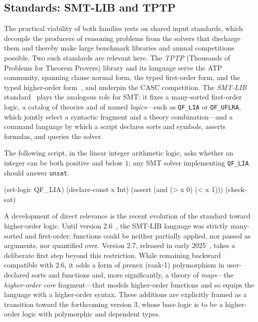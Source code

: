 \subsection{Standards: SMT-LIB and TPTP}
\label{subsec:smt-lib-tptp}

The practical viability of both families rests on shared input standards, which
decouple the producers of reasoning problems from the solvers that discharge
them and thereby make large benchmark libraries and annual competitions
possible.
Two such standards are relevant here.
The \emph{TPTP} (Thousands of Problems for Theorem Provers) library and its
language serve the ATP community, spanning clause normal form, the typed
first-order form, and the typed higher-order form~\cite{sutcliffe2017tptp}, and
underpin the CASC competition.
The \emph{SMT-LIB} standard~\cite{smtlib2.7} plays the analogous role for SMT: it
fixes a many-sorted first-order logic, a catalog of theories and of named
\emph{logics}---such as \texttt{QF\_LIA} or \texttt{QF\_UFLRA}, which jointly
select a syntactic fragment and a theory combination---and a command language by
which a script declares sorts and symbols, asserts formulas, and queries the
solver.

\begin{example}
The following script, in the linear integer arithmetic logic, asks whether an
integer can be both positive and below \(1\); any SMT solver implementing
\texttt{QF\_LIA} should answer \texttt{unsat}.
\begin{smtlisting}
(set-logic QF_LIA)
(declare-const x Int)
(assert (and (> x 0) (< x 1)))
(check-sat)
\end{smtlisting}
\end{example}

A development of direct relevance is the recent evolution of the standard toward
higher-order logic.
Until version 2.6~\cite{smtlib2.6}, the SMT-LIB language was strictly many-sorted and
first-order: functions could be neither partially applied, nor passed as
arguments, nor quantified over.
Version 2.7, released in early 2025~\cite{smtlib2.7}, takes a deliberate first
step beyond this restriction.
While remaining backward compatible with 2.6, it adds a form of prenex
(rank-1) polymorphism in user-declared sorts and functions and, more
significantly, a theory of \emph{maps}---the \emph{higher-order core} fragment---that
models higher-order functions and so equips the language with a higher-order
syntax.
These additions are explicitly framed as a transition toward the forthcoming
version 3, whose base logic is to be a higher-order logic with polymorphic and
dependent types.

